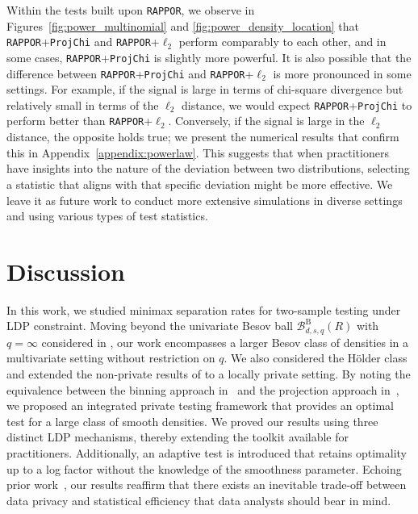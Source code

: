 \documentclass[twoside,11pt]{article}
\newcommand{\dimDensity}{d} %
\newcommand{\smoothness}{s}
\newcommand{\ballRadius}{R}
\newcommand{\besovParamNorm}{p}
\newcommand{\besovParamMicroscope}{q}
\newcommand{\ballDistn}{\mathcal{B}}
\newcommand{\besovBall}[2]{\ballDistn_{\dimDensity,\smoothness, #2}^{\mathrm{B}}(\ballRadius)}
\begin{document}
Within the tests built upon \texttt{RAPPOR}, we observe in Figures~\ref{fig:power_multinomial} and \ref{fig:power_density_location}  that \texttt{RAPPOR}+\texttt{ProjChi} and \texttt{RAPPOR}+$\ell_2$ perform comparably to each other, and in some cases, \texttt{RAPPOR}+\texttt{ProjChi} is slightly more powerful. 
It is also possible that the difference between \texttt{RAPPOR}+\texttt{ProjChi} and \texttt{RAPPOR}+$\ell_2$ is more pronounced in some settings. For example, if the signal is large in terms of chi-square divergence but relatively small in terms of the $\ell_2$ distance, we would expect \texttt{RAPPOR}+\texttt{ProjChi} to perform better than \texttt{RAPPOR}+$\ell_2$. Conversely, if the signal is large in the $\ell_2$ distance, the opposite holds true;
we present the numerical results that confirm this in Appendix~\ref{appendix:powerlaw}.
This suggests that when practitioners have insights into the nature of the deviation between two distributions, selecting a statistic that aligns with that specific deviation might be more effective. We leave it as future work to conduct more extensive simulations in diverse settings and using various types of test statistics.






%

\section{Discussion}
In this work, we studied minimax separation rates for two-sample testing under LDP constraint. Moving beyond the univariate Besov ball $\besovBall{\besovParamNorm}{\besovParamMicroscope}$ with $q=\infty$ considered in \citet{Lam-Weil2021MinimaxConstraint}, our work encompasses a larger Besov class of densities in a multivariate setting without restriction on $q$. We also considered the H\"{o}lder class and extended the non-private results of \citet{kim_minimax_2022} to a locally private setting. By noting the equivalence between the binning approach in~\citet{kim_minimax_2022} and the projection approach in~\citet{Lam-Weil2021MinimaxConstraint}, we proposed an integrated private testing framework that provides an optimal test for a large class of smooth densities. We proved our results using three distinct LDP mechanisms, thereby extending the toolkit available for practitioners. Additionally, an adaptive test is introduced that retains optimality up to a log factor without the knowledge of the smoothness parameter. Echoing prior work~\citep{Aliakbarpour2018DPgof, Aliakbarpour2019PrivatePermutations, Cai2017DPGofPrivit, Lam-Weil2021MinimaxConstraint}, our results reaffirm that there exists an inevitable trade-off between data privacy and statistical efficiency that data analysts should bear in mind.
\end{document}
